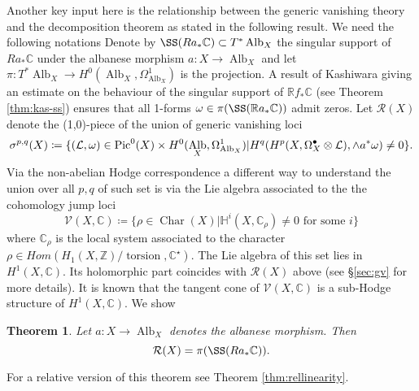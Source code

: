 \documentclass[12pt,reqno]{amsart}
\newtheorem{alphtheorem}{Theorem}
\theoremstyle{question}
\theoremstyle{definition}
\theoremstyle{remark}
\newtheorem{remark}[theorem]{Remark}
\theoremstyle{cited}
\theoremstyle{citeddef}
\DeclareMathOperator{\Alb}{Alb}
\DeclareMathOperator{\Char}{Char}
\def\Pic{{\rm Pic}}
\newcommand{\sL}{\mathcal{L}}
\newcommand{\sR}{\mathcal{R}}
\newcommand\sV{{\mathcal V}}
\newcommand{\bbC}{\mathbb{C}}
\newcommand{\bbH}{\mathbb{H}}
\newcommand{\bbR}{\mathbb{R}}
\newcommand{\bbZ}{\mathbb{Z}}
\DeclareMathOperator{\torsion}{torsion}
\begin{document}
 Another key input here is the relationship between the generic vanishing theory and the decomposition
theorem as stated in the following result. We need the following notations
Denote by $\SS(Ra_*\bbC)\subset T^*\Alb_X$ the singular support of $Ra_*\bbC$ under the albanese morphism $a\colon X\to \Alb_X$ and 
let $\pi\colon T^*\Alb_X\to 
H^0(\Alb_X, \Omega_{\Alb_X}^1)$ is the projection. A result of
Kashiwara giving an estimate on the behaviour of the singular
support of $\bbR f_*\bbC$ (see
Theorem \ref{thm:kas-ss}) ensures that all 1-forms
$\omega\in \pi(\SS(\bbR a_*\bbC))$ admit zeros. Let $\sR(X)$ denote the (1,0)-piece of the union of generic vanishing loci
\[\sigma^{p,q}(X) \coloneqq \{(\sL,\omega)\in \Pic^0(X)\times H^0(\Alb_X,\Omega_{\Alb_X}^1)|H^q(H^{p}(X, \Omega_X^{\bullet}\otimes \sL), \wedge a^*\omega) \neq 0\}.\]
Via the non-abelian Hodge correspondence a different way to understand the union over all $p,q$ of such set is via the Lie algebra associated to the  the cohomology jump loci 
\[\sV(X,\bbC) \coloneqq \{\rho\in\Char(X)| \bbH^i(X, \bbC_{\rho})\neq  0\text{ for some } i\} \]
where $\bbC_{\rho}$ is the local system associated 
to the character $\rho\in Hom(H_1(X,\bbZ)/\torsion, \bbC^{\star})$.
The Lie algebra of this set lies in $H^1(X,\bbC)$. Its holomorphic part coincides with $\sR(X)$ above
(see \S \ref{sec:gv} for more details). It is known that the tangent cone of $\sV(X,\bbC)$ is a sub-Hodge structure of $H^1(X,\bbC)$.
We show
\begin{alphtheorem}
Let $a\colon X\to \Alb_X$ denotes the albanese morphism. Then
\[\sR(X) =  \pi(\SS(Ra_*\bbC)). \]
\label{thm:linearity}
\end{alphtheorem}
For a relative version of this theorem see Theorem \ref{thm:rellinearity}.
\end{document}
